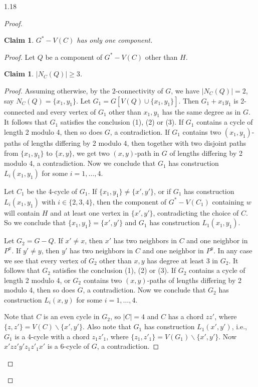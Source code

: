 \documentclass[10pt]{article}
\newtheorem{claim}{Claim}
\newtheorem{subclaim}{Claim}[claim]
\begin{document}
\begin{spacing}{1.18}
\begin{proof}
\begin{claim}\label{claim: onecomponentH}
    $G^*-V(C)$ has only one component.
\end{claim}

\begin{proof}
    Let $Q$ be a component of $G^*-V(C)$ other than $H$.

    \begin{subclaim}\label{claim: NCQgeq3}
        $|N_C(Q)|\geqslant 3$.
    \end{subclaim}

    \begin{proof}
        Assuming otherwise, by the 2-connectivity of $G$, we have $|N_C(Q)|=2$, say $N_C(Q)=\{x_1,y_1\}$. Let $G_1=G[V(Q)\cup\{x_1,y_1\}]$. Then $G_1+x_1y_1$ is 2-connected and every vertex of $G_1$ other than $x_1,y_1$ has the same degree as in $G$. It follows that $G_1$ satisfies the conclusion (1), (2) or (3). If $G_1$ contains a cycle of length 2 modulo 4, then so does $G$, a contradiction. If $G_1$ contains two $(x_1,y_1)$-paths of lengths differing by 2 modulo 4, then together with two disjoint paths from $\{x_1,y_1\}$ to $\{x,y\}$, we get two $(x,y)$-path in $G$ of lengths differing by 2 modulo 4, a contradiction. Now we conclude that $G_1$ has construction $L_i(x_1,y_1)$ for some $i=1,\ldots,4$.

        Let $C_1$ be the 4-cycle of $G_1$. If $\{x_1,y_1\}\neq\{x',y'\}$, or if $G_1$ has construction $L_i(x_1,y_1)$ with $i\in\{2,3,4\}$, then the component of $G^*-V(C_1)$ containing $w$ will contain $H$ and at least one vertex in $\{x',y'\}$, contradicting the choice of $C$. So we conclude that $\{x_1,y_1\}=\{x',y'\}$ and $G_1$ has construction $L_1(x_1,y_1)$.

        Let $G_2=G-Q$. If $x'\neq x$, then $x'$ has two neighbors in $C$ and one neighbor in $P^x$. If $y'\neq y$, then $y'$ has two neighbors in $C$ and one neighbor in $P^y$. In any case we see that every vertex of $G_2$ other than $x,y$ has degree at least 3 in $G_2$. It follows that $G_2$ satisfies the conclusion (1), (2) or (3). If $G_2$ contains a cycle of length 2 modulo 4, or $G_2$ contains two $(x,y)$-paths of lengths differing by 2 modulo 4, then so does $G$, a contradiction. Now we conclude that $G_2$ has construction $L_i(x,y)$ for some $i=1,\ldots,4$.

        Note that $C$ is an even cycle in $G_2$, so $|C|=4$ and $C$ has a chord $zz'$, where $\{z,z'\}=V(C)\backslash\{x',y'\}$. Also note that $G_1$ has construction $L_1(x',y')$, i.e., $G_1$ is a 4-cycle with a chord $z_1z'_1$, where $\{z_1,z'_1\}=V(G_1)\backslash\{x',y'\}$. Now $x'zz'y'z_1z'_1x'$ is a 6-cycle of $G$, a contradiction. 
    \end{proof}


\end{proof}
\end{proof}
\end{spacing}
\end{document}
